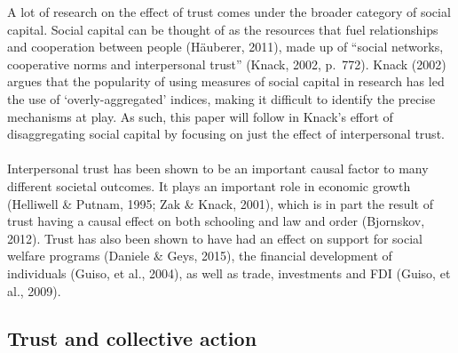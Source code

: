 \documentclass[
  12pt,
]{article}
\begin{document}
A lot of research on the effect of trust comes under the broader category of social capital. Social capital can be thought of as the resources that fuel relationships and cooperation between people (Häuberer, 2011), made up of ``social networks, cooperative norms and interpersonal trust'' (Knack, 2002, p.~772). Knack (2002) argues that the popularity of using measures of social capital in research has led the use of `overly-aggregated' indices, making it difficult to identify the precise mechanisms at play. As such, this paper will follow in Knack's effort of disaggregating social capital by focusing on just the effect of interpersonal trust.\\
~\\
Interpersonal trust has been shown to be an important causal factor to many different societal outcomes. It plays an important role in economic growth (Helliwell \& Putnam, 1995; Zak \& Knack, 2001), which is in part the result of trust having a causal effect on both schooling and law and order (Bjornskov, 2012). Trust has also been shown to have had an effect on support for social welfare programs (Daniele \& Geys, 2015), the financial development of individuals (Guiso, et al., 2004), as well as trade, investments and FDI (Guiso, et al., 2009).\\

\hypertarget{trust-and-collective-action}{%
\subsection{Trust and collective action}\label{trust-and-collective-action}}
\end{document}
